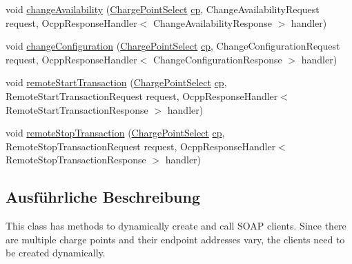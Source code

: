 \begin{DoxyCompactItemize}
\item 
void \hyperlink{classde_1_1rwth_1_1idsg_1_1steve_1_1ocpp_1_1soap_1_1_charge_point_service12___soap_invoker_a8145a6c5ab9bc6251eab8bfc10461b81}{change\+Availability} (\hyperlink{classde_1_1rwth_1_1idsg_1_1steve_1_1repository_1_1dto_1_1_charge_point_select}{Charge\+Point\+Select} \hyperlink{get_transaction_ids_8js_a02fb69feb56940fd46d72ea6a60e511f}{cp}, Change\+Availability\+Request request, Ocpp\+Response\+Handler$<$ Change\+Availability\+Response $>$ handler)
\item 
void \hyperlink{classde_1_1rwth_1_1idsg_1_1steve_1_1ocpp_1_1soap_1_1_charge_point_service12___soap_invoker_a9d9f46a544b0cd8df77beb84bd9d0e21}{change\+Configuration} (\hyperlink{classde_1_1rwth_1_1idsg_1_1steve_1_1repository_1_1dto_1_1_charge_point_select}{Charge\+Point\+Select} \hyperlink{get_transaction_ids_8js_a02fb69feb56940fd46d72ea6a60e511f}{cp}, Change\+Configuration\+Request request, Ocpp\+Response\+Handler$<$ Change\+Configuration\+Response $>$ handler)
\item 
void \hyperlink{classde_1_1rwth_1_1idsg_1_1steve_1_1ocpp_1_1soap_1_1_charge_point_service12___soap_invoker_a5948354388168041eeff68539a6c7c35}{remote\+Start\+Transaction} (\hyperlink{classde_1_1rwth_1_1idsg_1_1steve_1_1repository_1_1dto_1_1_charge_point_select}{Charge\+Point\+Select} \hyperlink{get_transaction_ids_8js_a02fb69feb56940fd46d72ea6a60e511f}{cp}, Remote\+Start\+Transaction\+Request request, Ocpp\+Response\+Handler$<$ Remote\+Start\+Transaction\+Response $>$ handler)
\item 
void \hyperlink{classde_1_1rwth_1_1idsg_1_1steve_1_1ocpp_1_1soap_1_1_charge_point_service12___soap_invoker_acfbbc89fbeecc79fff1514768bac886e}{remote\+Stop\+Transaction} (\hyperlink{classde_1_1rwth_1_1idsg_1_1steve_1_1repository_1_1dto_1_1_charge_point_select}{Charge\+Point\+Select} \hyperlink{get_transaction_ids_8js_a02fb69feb56940fd46d72ea6a60e511f}{cp}, Remote\+Stop\+Transaction\+Request request, Ocpp\+Response\+Handler$<$ Remote\+Stop\+Transaction\+Response $>$ handler)
\end{DoxyCompactItemize}


\subsection{Ausführliche Beschreibung}
This class has methods to dynamically create and call S\+O\+A\+P clients. Since there are multiple charge points and their endpoint addresses vary, the clients need to be created dynamically.

